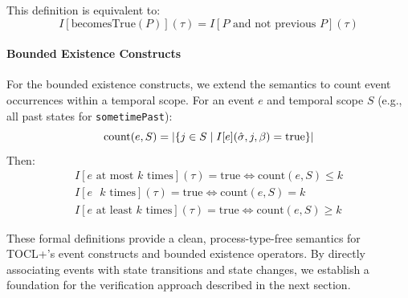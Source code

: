 This definition is equivalent to:
\begin{equation}
I[\text{becomesTrue}(P)](\tau) = I[P \text{ and not previous } P](\tau)
\end{equation}

\paragraph{Bounded Existence Constructs}
For the bounded existence constructs, we extend the semantics to count event 
occurrences within a temporal scope. For an event $e$ and temporal scope $S$ 
(e.g., all past states for \texttt{sometimePast}):
\begin{equation}
\text{count}(e, S) = |\{j \in S \mid I[e](\hat{\sigma}, j, \beta) = \text{true}\}|
\vspace{-1em}
\end{equation}
Then:
\begin{equation}
\begin{split}
I[e \text{ at most } k \text{ times}](\tau) = \text{true} \iff \text{count}(e, S) \leq k \\
I[e \text{  } k \text{ times}](\tau) = \text{true} \iff \text{count}(e, S) = k \\
I[e \text{ at least } k \text{ times}](\tau) = \text{true} \iff \text{count}(e, S) \geq k
\end{split}
\end{equation}

These formal definitions provide a clean, process-type-free semantics for TOCL+'s 
event constructs and bounded existence operators. By directly associating events with 
state transitions and state changes, we establish a foundation for the verification 
approach described in the next section.

